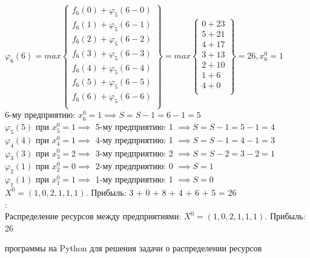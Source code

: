 $\varphi_6(6) = max \begin{Bmatrix}
    f_6(0) + \varphi_5(6 - 0) \\
    f_6(1) + \varphi_5(6 - 1) \\
    f_6(2) + \varphi_5(6 - 2) \\
    f_6(3) + \varphi_5(6 - 3) \\
    f_6(4) + \varphi_5(6 - 4) \\
    f_6(5) + \varphi_5(6 - 5) \\
    f_6(6) + \varphi_5(6 - 6) \\
\end{Bmatrix} = max \begin{Bmatrix}
    0 + 23 \\
    5 + 21 \\
    4 + 17 \\
    3 + 13 \\
    2 + 10 \\
    1 + 6 \\
    4 + 0 \\
\end{Bmatrix} = 26, x_6^0 = 1$\\

6-му предприятию: $x_6^0 = 1 \implies S = S - 1 = 6 - 1 = 5$\\
$\varphi_5(5)$ при $x_5^0 = 1 \implies$ 5-му предприятию: 1 $\implies S = S - 1 = 5 - 1 = 4$\\
$\varphi_4(4)$ при $x_4^0 = 1 \implies$ 4-му предприятию: 1 $\implies S = S - 1 = 4 - 1 = 3$\\
$\varphi_3(3)$ при $x_3^0 = 2 \implies$ 3-му предприятию: 2 $\implies S = S - 2 = 3 - 2 = 1$\\
$\varphi_2(1)$ при $x_2^0 = 0 \implies$ 2-му предприятию: 0 $\implies S = 1$\\
$\varphi_1(1)$ при $x_1^0 = 1 \implies$ 1-му предприятию: 1 $\implies S = 0$\\

$X^0 = (1, 0, 2, 1, 1, 1)$. Прибыль: 3 + 0 + 8 + 4 + 6 + 5 = 26\\

{: }\\ Распределение ресурсов между предприятиями: $X^0 = (1, 0, 2, 1, 1, 1)$. Прибыль: 26\\
\newpage

{ программы на Python для решения задачи о распределении ресурсов}

